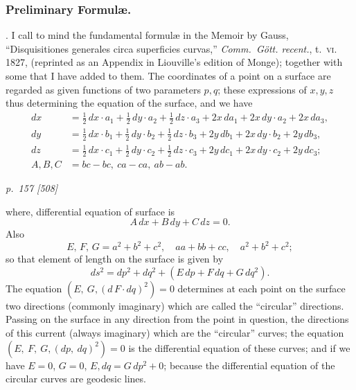 \documentclass[11pt,a4paper]{book}
\begin{document}
\subsubsection*{Preliminary Formul\ae.}

. I call to mind the fundamental formul\ae{} in the Memoir by Gauss, ``Disquisitiones
generales circa superficies curvas,'' \textit{Comm.\ G\"ott. recent.}, t.\ \textsc{vi}. 1827, (reprinted as an
Appendix in Liouville's edition of Monge); together with some that I have added to
them. The coordinates of a point on a surface are regarded as given functions
of two parameters $p, q$; these expressions of $x, y, z$ thus determining the equation
of the surface, and we have
\begin{align*}
dx &= \tfrac{1}{2}\,dx\cdot a_1 + \tfrac{1}{2}\,dy\cdot a_2 + \tfrac{1}{2}\,dz\cdot a_3 + 2x\,da_1 + 2x\,dy\cdot a_2 + 2x\,da_3,\\
dy &= \tfrac{1}{2}\,dx\cdot b_1 + \tfrac{1}{2}\,dy\cdot b_2 + \tfrac{1}{2}\,dz\cdot b_3 + 2y\,db_1 + 2x\,dy\cdot b_2 + 2y\,db_3,\\
dz &= \tfrac{1}{2}\,dx\cdot c_1 + \tfrac{1}{2}\,dy\cdot c_2 + \tfrac{1}{2}\,dz\cdot c_3 + 2y\,dc_1 + 2x\,dy\cdot c_2 + 2y\,dc_3;\\
A, B, C &= bc - bc,\ ca - ca,\ ab - ab.
\end{align*}

\clearpage

\bigskip
\textit{p.~157 [508]}
\smallskip

\noindent
where, differential equation of surface is
\[
A\,dx + B\,dy + C\,dz = 0.
\]
Also
\[
E,\,F,\,G = a^2 + b^2 + c^2,\quad aa + bb + cc, \quad a^2 + b^2 + c^2;
\]
so that element of length on the surface is given by
\[
ds^2 = dp^2 + dq^2 + (E\,dp + F\,dq + G\,dq^2).
\]
The equation $(E,\ G,(d\,F\cdot dq)^2)= 0$ determines at each point on the surface two
directions (commonly imaginary) which are called the ``circular'' directions. Passing on
the surface in any direction from the point in question, the directions of this current
(always imaginary) which are the ``circular'' curves; the equation $(E,\ F,\ G,(dp,\ dq)^2)= 0$
is the differential equation of these curves; and if we have $E = 0$, $G = 0$, $E,dq = G\,dp^2 + 0$;
because the differential equation of the circular curves are geodesic lines.
\end{document}
